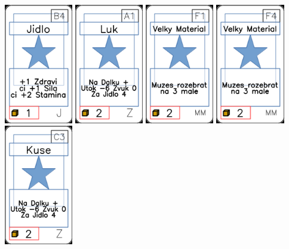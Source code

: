 \documentclass[a4paper]{article}
\begin{document}
	\includegraphics[width=3.0cm]{img-1_8}
	\includegraphics[width=3.0cm]{img-1_90}
	\includegraphics[width=3.0cm]{img-1_55}
	\includegraphics[width=3.0cm]{img-1_58}
	\includegraphics[width=3.0cm]{img-1_102}
\end{document}
